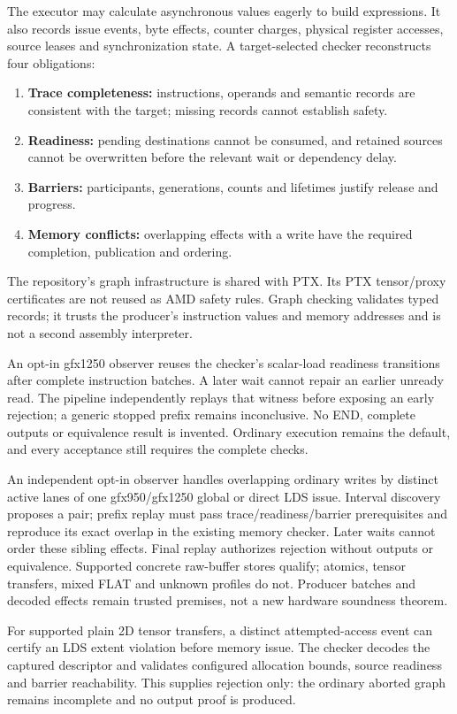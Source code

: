 \documentclass[10pt,letterpaper]{article}
\begin{document}
The executor may calculate asynchronous values eagerly to build expressions.
It also records issue events, byte effects, counter charges, physical register
accesses, source leases and synchronization state. A target-selected checker
reconstructs four obligations:
\begin{enumerate}
\item \textbf{Trace completeness:} instructions, operands and semantic records
are consistent with the target; missing records cannot establish safety.
\item \textbf{Readiness:} pending destinations cannot be consumed, and retained
sources cannot be overwritten before the relevant wait or dependency delay.
\item \textbf{Barriers:} participants, generations, counts and lifetimes justify
release and progress.
\item \textbf{Memory conflicts:} overlapping effects with a write have the
required completion, publication and ordering.
\end{enumerate}
The repository's graph infrastructure is shared with PTX. Its PTX tensor/proxy
certificates are not reused as AMD safety rules. Graph checking validates typed
records; it trusts the producer's instruction values and memory addresses and
is not a second assembly interpreter.

An opt-in gfx1250 observer reuses the checker's scalar-load readiness transitions
after complete instruction batches. A later wait cannot repair an earlier
unready read. The pipeline independently replays that witness before exposing
an early rejection; a generic stopped prefix remains inconclusive. No END,
complete outputs or equivalence result is invented. Ordinary execution remains
the default, and every acceptance still requires the complete checks.

An independent opt-in observer handles overlapping ordinary writes by distinct
active lanes of one gfx950/gfx1250 global or direct LDS issue. Interval discovery
proposes a pair; prefix replay must pass trace/readiness/barrier prerequisites
and reproduce its exact overlap in the existing memory checker. Later waits
cannot order these sibling effects. Final replay authorizes rejection without
outputs or equivalence. Supported concrete raw-buffer stores qualify; atomics,
tensor transfers, mixed FLAT and unknown profiles do not. Producer batches and
decoded effects remain trusted premises, not a new hardware soundness theorem.

For supported plain 2D tensor transfers, a distinct attempted-access event can
certify an LDS extent violation before memory issue. The checker decodes the
captured descriptor and validates configured allocation bounds, source readiness
and barrier reachability. This supplies rejection only: the ordinary aborted
graph remains incomplete and no output proof is produced.
\end{document}
